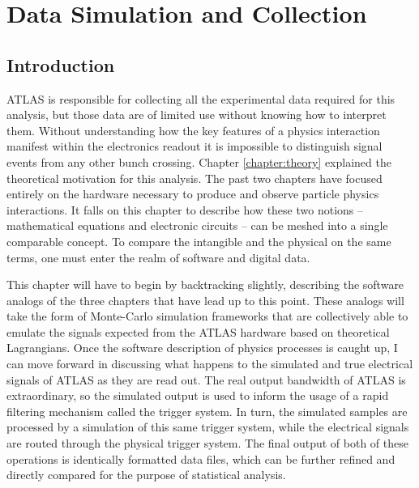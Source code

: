 \chapter{Data Simulation and Collection} \label{chapter:data}

\section{Introduction}
    
    ATLAS is responsible for collecting all the experimental data required for this analysis,
        but those data are of limited use without knowing how to interpret them.
    Without understanding how the key features of a physics interaction manifest within the electronics readout
        it is impossible to distinguish signal events from any other bunch crossing.
    Chapter \ref{chapter:theory} explained the theoretical motivation for this analysis.
    The past two chapters have focused entirely on the hardware necessary to produce and observe particle physics interactions.
    It falls on this chapter to describe how these two notions --
        mathematical equations and electronic circuits -- can be meshed into a single comparable concept.
    To compare the intangible and the physical on the same terms,
        one must enter the realm of software and digital data.

    This chapter will have to begin by backtracking slightly,
        describing the software analogs of the three chapters that have lead up to this point.
    These analogs will take the form of Monte-Carlo simulation frameworks
        that are collectively able to emulate the signals expected from the ATLAS hardware
        based on theoretical Lagrangians.
    Once the software description of physics processes is caught up,
        I can move forward in discussing what happens to the
        simulated and true electrical signals of ATLAS as they are read out.
    The real output bandwidth of ATLAS is extraordinary,
        so the simulated output is used to inform the usage of
        a rapid filtering mechanism called the trigger system.
    In turn, the simulated samples are processed by a simulation of this same trigger system,
        while the electrical signals are routed through the physical trigger system.
    The final output of both of these operations is identically formatted data files,
        which can be further refined and directly compared for the purpose of statistical analysis.
        


